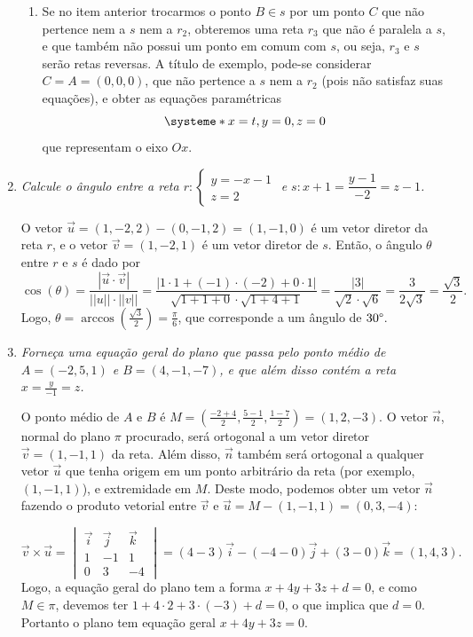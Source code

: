 \documentclass[12pt,a4paper]{article}
\newcommand{\norm}[1]{\left|\left|{#1}\right|\right|}
\begin{document}
\begin{enumerate}
\begin{enumerate}
\item Se no item anterior trocarmos o ponto $B \in s$ por um ponto $C$ que não pertence nem a $s$ nem a $r_2$, obteremos uma reta $r_3$ que não é paralela a $s$, e que também não possui um ponto em comum com $s$, ou seja, $r_3$ e $s$ serão retas reversas. A título de exemplo, pode-se considerar $C = A = (0,0,0)$, que não pertence a $s$ nem a $r_2$ (pois não satisfaz suas equações), e obter as equações paramétricas
\[
\systeme*{
x = t,
y = 0,
z = 0
}
\]
que representam o eixo $Ox$.
\end{enumerate}


\item \textit{ Calcule o ângulo entre a reta $r : \begin{cases}
y = -x -1 \\
z = 2
\end{cases}$ e $s: x+1 = \dfrac{y-1}{-2} = z-1$. }

O vetor $\vec{u} = (1,-2,2) - (0,-1,2) = (1,-1,0)$ é um vetor diretor da reta $r$, e o vetor $\vec{v} = (1,-2,1)$ é um vetor diretor de $s$. Então, o ângulo $\theta$ entre $r$ e $s$ é dado por
\[
\cos(\theta)
= \frac{|\vec{u} \cdot \vec{v}|}{\norm{u} \cdot \norm{v}}
= \frac{|1 \cdot 1 + (-1) \cdot (-2) + 0 \cdot 1|}
       {\sqrt{1 + 1 + 0} \cdot \sqrt{1+4+1}}
= \frac{|3|}{\sqrt{2} \cdot \sqrt{6}}
= \frac{3}{2\sqrt{3}}
= \frac{\sqrt{3}}{2}.
\]
Logo, $\theta = \operatorname{arccos}(\frac{\sqrt{3}}{2}) = \frac{\pi}{6}$, que corresponde a um ângulo de $30\degree$.

\item \textit{ Forneça uma equação geral do plano que passa pelo ponto médio de $A = (-2,5,1)$ e $B = (4,-1,-7)$, e que além disso contém a reta $x = \frac{y}{-1} = z$. }

O ponto médio de $A$ e $B$ é $M = \left(\frac{-2+4}{2}, \frac{5-1}{2}, \frac{1-7}{2}\right) = (1,2,-3)$. O vetor $\vec{n}$, normal do plano $\pi$ procurado, será ortogonal a um vetor diretor $\vec{v} = (1,-1,1)$ da reta. Além disso, $\vec{n}$ também será ortogonal a qualquer vetor $\vec{u}$ que tenha origem em um ponto arbitrário da reta (por exemplo, $(1,-1,1)$), e extremidade em $M$. Deste modo, podemos obter um vetor $\vec{n}$ fazendo o produto vetorial entre $\vec{v}$ e $\vec{u} = M - (1,-1,1) = (0,3,-4)$:

\[
\vec{v} \times \vec{u} =
\begin{vmatrix}
\vec{i} & \vec{j} & \vec{k} \\
1 & -1 & 1 \\
0 & 3 & -4
\end{vmatrix}
= (4 - 3) \vec{i} - (-4 - 0) \vec{j} + (3 - 0) \vec{k}
= (1, 4, 3).
\]
Logo, a equação geral do plano tem a forma $x + 4y + 3z + d = 0$, e como $M \in \pi$, devemos ter $1 + 4 \cdot 2 + 3 \cdot(-3) + d = 0$, o que implica que $d = 0$. Portanto o plano tem equação geral $x + 4y + 3z = 0$.


\end{enumerate}
\end{document}
